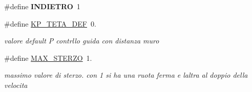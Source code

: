 \begin{DoxyCompactItemize}
\#define {\bfseries I\+N\+D\+I\+E\+T\+RO}~1
\item 
\mbox{\label{ari_pi__2_d_c__esp__08_8ino_a6ae4300a3f1fbbb8e3d4393603b6d402}} 
\#define \mbox{\hyperlink{ari_pi__2_d_c__esp__08_8ino_a6ae4300a3f1fbbb8e3d4393603b6d402}{K\+P\+\_\+\+T\+E\+T\+A\+\_\+\+D\+EF}}~0.
\begin{DoxyCompactList}\small\item\em valore default P contrllo guida con distanza muro \end{DoxyCompactList}\item 
\mbox{\label{ari_pi__2_d_c__esp__08_8ino_ae69228439056c7947d8c67f0e31cd555}} 
\#define \mbox{\hyperlink{ari_pi__2_d_c__esp__08_8ino_ae69228439056c7947d8c67f0e31cd555}{M\+A\+X\+\_\+\+S\+T\+E\+R\+ZO}}~1.
\begin{DoxyCompactList}\small\item\em massimo valore di sterzo. con 1 si ha una ruota ferma e l\textquotesingle{}altra al doppio della velocita\textquotesingle{} \end{DoxyCompactList}\end{DoxyCompactItemize}
